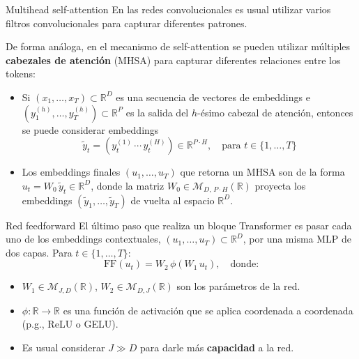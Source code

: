 \documentclass{beamer}
\newcommand{\R}{\mathbb{R}}
\begin{document}
\begin{frame}{Multihead self-attention}
    En las redes convolucionales es usual utilizar varios filtros convolucionales para capturar diferentes patrones.

    De forma análoga, en el mecanismo de self-attention se pueden utilizar múltiples \textbf{cabezales de atención} (MHSA) para capturar diferentes relaciones entre los tokens:
    \begin{itemize}
        \item Si $(x_1,\ldots,x_T)\subset\R^D$ es una secuencia de vectores de embeddings e $(y_1^{(h)},\ldots,y_T^{(h)})\subset\R^P$ es la salida del $h$-ésimo cabezal de atención, entonces se puede considerar embeddings
              \begin{equation*}
                  \tilde y_t=\left(y_t^{(1)}\,\cdots\, y_t^{(H)}\right)\in\R^{P\cdot H},\quad \text{para } t\in\{1,\ldots,T\}
              \end{equation*}

        \item Los embeddings finales $(u_1,\ldots,u_T)$ que retorna un MHSA son de la forma $u_t=W_0\, \tilde y_t\in\R^D$, donde la matriz $W_0\in\mathcal{M}_{D,\,P\cdot H}(\R)$ proyecta los embeddings $(\tilde y_1,\ldots,\tilde y_T)$ de vuelta al espacio $\R^D$.
    \end{itemize}
\end{frame}

\begin{frame}{Red feedforward}
    El último paso que realiza un bloque Transformer es pasar cada uno de los embeddings contextuales, $(u_1,\ldots,u_T)\subset\R^D$, por una misma MLP de dos capas. Para $t\in\{1,\ldots,T\}$:
    \begin{equation*}
        \text{FF}(u_t)=W_2\,\phi\left(W_1\,u_t\right),
        \quad\text{donde:}
    \end{equation*}
    \vspace{-0.8cm}
    \begin{itemize}
        \item $W_1\in\mathcal{M}_{J,D}(\R)$, $W_2\in\mathcal{M}_{D,J}(\R)$ son los parámetros de la red.
        \item  $\phi:\R\to\R$ es una función de activación que se aplica coordenada a coordenada (p.g., ReLU o GELU).
        \item Es usual considerar $J\gg D$ para darle más \textbf{capacidad} a la red.
    \end{itemize}
\end{frame}
\end{document}
